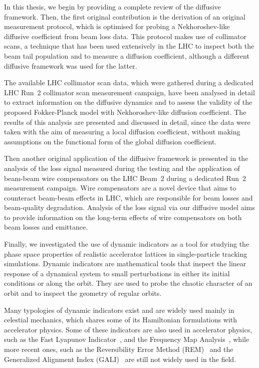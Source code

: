 In this thesis, we begin by providing a complete review of the diffusive framework. Then, the first original contribution is the derivation of an original measurement protocol, which is optimised for probing a Nekhoroshev-like diffusive coefficient from beam loss data. This protocol makes use of collimator scans, a technique that has been used extensively in the LHC to inspect both the beam tail population and to measure a diffusion coefficient, although a different diffusive framework was used for the latter.

The available LHC collimator scan data, which were gathered during a dedicated LHC Run~2 collimator scan measurement campaign, have been analysed in detail to extract information on the diffusive dynamics and to assess the validity of the proposed Fokker-Planck model with Nekhoroshev-like diffusion coefficient. The results of this analysis are presented and discussed in detail, since the data were taken with the aim of measuring a local diffusion coefficient, without making assumptions on the functional form of the global diffusion coefficient.

Then another original application of the diffusive framework is presented in the analysis of the loss signal measured during the testing and the application of beam-beam wire compensators on the LHC Beam~2 during a dedicated Run~2 measurement campaign. Wire compensators are a novel device that aims to counteract beam-beam effects in LHC, which are responsible for beam losses and beam-quality degradation. Analysis of the loss signal via our diffusive model aims to provide information on the long-term effects of wire compensators on both beam losses and emittance. 

Finally, we investigated the use of dynamic indicators as a tool for studying the phase space properties of realistic accelerator lattices in single-particle tracking simulations. Dynamic indicators are mathematical tools that inspect the linear response of a dynamical system to small perturbations in either its initial conditions or along the orbit. They are used to probe the chaotic character of an orbit and to inspect the geometry of regular orbits. 

Many typologies of dynamic indicators exist and are widely used mainly in celestial mechanics, which shares some of its Hamiltonian formulations with accelerator physics. Some of these indicators are also used in accelerator physics, such as the Fast Lyapunov Indicator~\cite{Froeschle1997, SZEZECH2005394}, and the Frequency Map Analysis~\cite{Laskar1999,Laskar2003}, while more recent ones, such as the Reversibility Error Method (REM)~\cite{Panichi2016,Panichi2017} and the Generalized Alignment Index (GALI)~\cite{Bountis2007,Skokos2015} are still not widely used in the field.

